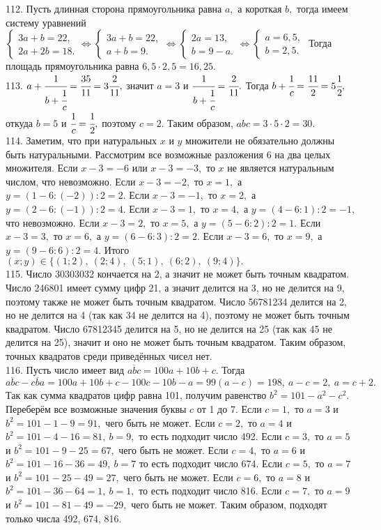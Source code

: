 112. Пусть длинная сторона прямоугольника равна $a,$ а короткая $b,$ тогда имеем систему уравнений $\begin{cases} 3a+b=22,\\ 2a+2b=18.\end{cases}\Leftrightarrow
\begin{cases} 3a+b=22,\\ a+b=9.\end{cases}\Leftrightarrow
\begin{cases} 2a=13,\\ b=9-a.\end{cases}\Leftrightarrow
\begin{cases} a=6,5,\\ b=2,5.\end{cases}$ Тогда площадь прямоугольника равна $6,5\cdot2,5=16,25.$\\
113. $a+\cfrac{1}{b+\cfrac{1}{c}}=\cfrac{35}{11}=3\cfrac{2}{11},$ значит $a=3$ и $\cfrac{1}{b+\cfrac{1}{c}}=\cfrac{2}{11}.$ Тогда $b+\cfrac{1}{c}=\cfrac{11}{2}=5\cfrac{1}{2},$ откуда $b=5$ и $\cfrac{1}{c}=\cfrac{1}{2},$ поэтому $c=2.$ Таким образом, $abc=3\cdot5\cdot2=30.$\\
114. Заметим, что при натуральных $x$ и $y$ множители не обязательно должны быть натуральными. Рассмотрим все возможные разложения 6 на два целых множителя. Если $x-3=-6$ или $x-3=-3,$ то $x$ не является натуральным числом, что невозможно. Если $x-3=-2,$ то $x=1,$ а $y=(1-6:(-2)):2=2.$ Если $x-3=-1,$ то $x=2,$ а $y=(2-6:(-1)):2=4.$ Если $x-3=1,$ то $x=4,$ а $y=(4-6:1):2=-1,$ что невозможно. Если $x-3=2,$ то $x=5,$ а $y=(5-6:2):2=1.$ Если $x-3=3,$ то $x=6,$ а $y=(6-6:3):2=2.$ Если $x-3=6,$ то $x=9,$ а $y=(9-6:6):2=4.$ Итого $(x;y)\in\{(1;2),\ (2;4),\ (5;1),\ (6;2),\ (9;4)\}.$\\
115. Число 30303032 кончается на 2, а значит не может быть точным квадратом. Число 246801 имеет сумму цифр 21, а значит делится на 3, но не делится на 9, поэтому также не может быть точным квадратом. Число 56781234 делится на 2, но не делится на 4 (так как 34 не делится на 4), поэтому не может быть точным квадратом. Число 67812345 делится на 5, но не делится на 25 (так как 45 не делится на 25), значит и оно не может быть точным квадратом. Таким образом, точных квадратов среди приведённых чисел нет.\\
116. Пусть число имеет вид $\overline{abc}=100a+10b+c.$ Тогда $\overline{abc}-\overline{cba}=100a+10b+c-100c-10b-a=99(a-c)=198,\ a-c=2,\ a=c+2.$ Так как сумма квадратов цифр равна 101, получим равенство $b^2=101-a^2-c^2.$ Переберём все возможные значения буквы $c$ от 1 до 7. Если $c=1,$ то $a=3$ и $b^2=101-1-9=91,$ чего быть не может. Если $c=2,$ то $a=4$ и $b^2=101-4-16=81,\ b=9,$ то есть подходит число 492. Если $c=3,$ то $a=5$ и $b^2=101-9-25=67,$ чего быть не может. Если $c=4,$ то $a=6$ и $b^2=101-16-36=49,\ b=7$ то есть подходит число 674. Если $c=5,$ то $a=7$ и $b^2=101-25-49=27,$ чего быть не может. Если $c=6,$ то $a=8$ и $b^2=101-36-64=1,\ b=1,$ то есть подходит число 816. Если $c=7,$ то $a=9$ и $b^2=101-81-49=-29,$ чего быть не может. Таким образом, подходят только числа 492, 674, 816.\\
